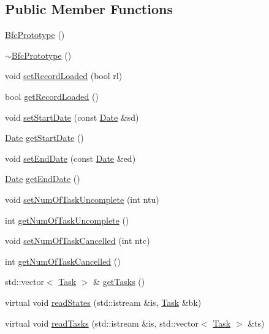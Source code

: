 \subsection*{Public Member Functions}
\begin{DoxyCompactItemize}
\item 
\hyperlink{classBfcPrototype_a1d7d4392c17131eec1bc4219c2570433}{Bfc\-Prototype} ()
\item 
\hyperlink{classBfcPrototype_a004df1fc2cc7e03a4263edbe58c8f9fd}{$\sim$\-Bfc\-Prototype} ()
\item 
void \hyperlink{classBfcPrototype_ac38bd69cfe25044d2d866f2418795095}{set\-Record\-Loaded} (bool rl)
\item 
bool \hyperlink{classBfcPrototype_ad043f4e365502a6aec354d4f628c1404}{get\-Record\-Loaded} ()
\item 
void \hyperlink{classBfcPrototype_abb4cd3d18d2646878e00f910a89def2d}{set\-Start\-Date} (const \hyperlink{classDate}{Date} \&sd)
\item 
\hyperlink{classDate}{Date} \hyperlink{classBfcPrototype_affedd6397fcaef70f5fa397abbbf2901}{get\-Start\-Date} ()
\item 
void \hyperlink{classBfcPrototype_ab0c5d38d1e9cf0fe02e3fb5da830a802}{set\-End\-Date} (const \hyperlink{classDate}{Date} \&ed)
\item 
\hyperlink{classDate}{Date} \hyperlink{classBfcPrototype_ace745963c4c4fca8cae7c26240acf896}{get\-End\-Date} ()
\item 
void \hyperlink{classBfcPrototype_a063443b1a0a90b795c156381b41e915d}{set\-Num\-Of\-Task\-Uncomplete} (int ntu)
\item 
int \hyperlink{classBfcPrototype_af9a1299268eefad25f59b7bdb7dba5d7}{get\-Num\-Of\-Task\-Uncomplete} ()
\item 
void \hyperlink{classBfcPrototype_a3ac9f7f398cfdf3cc499f955f263672f}{set\-Num\-Of\-Task\-Cancelled} (int ntc)
\item 
int \hyperlink{classBfcPrototype_ae24a6187235106026e978fcbe49c1944}{get\-Num\-Of\-Task\-Cancelled} ()
\item 
std\-::vector$<$ \hyperlink{classTask}{Task} $>$ \& \hyperlink{classBfcPrototype_a414637b5643f0ef2a8834d1d591da364}{get\-Tasks} ()
\item 
virtual void \hyperlink{classBfcPrototype_a5dc018641f00dd03d166a6df7dcfbc4a}{read\-States} (std\-::istream \&is, \hyperlink{classTask}{Task} \&bk)
\item 
virtual void \hyperlink{classBfcPrototype_a664d219b93aa7ecf98b2686c72f918f6}{read\-Tasks} (std\-::istream \&is, std\-::vector$<$ \hyperlink{classTask}{Task} $>$ \&ts)
\end{DoxyCompactItemize}
